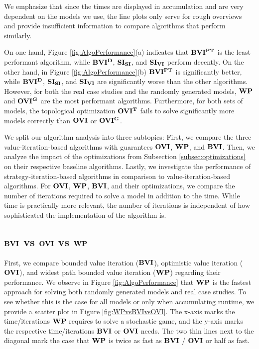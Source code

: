 We emphasize that since the times are displayed in accumulation and are very dependent on the models we use, 
the line plots only serve for rough overviews and provide insufficient information to compare algorithms that perform similarly.

On one hand, Figure \ref{fig:AlgoPerformance}(a) indicates that $\mathbf{BVI^{PT}}$ is the least performant algorithm, while $\mathbf{BVI^D}$, $\mathbf{SI_{SI}}$, and $\mathbf{SI_{VI}}$ perform decently.
On the other hand, in Figure \ref{fig:AlgoPerformance}(b) $\mathbf{BVI^{PT}}$ is significantly better, while $\mathbf{BVI^D}$, $\mathbf{SI_{SI}}$, and $\mathbf{SI_{VI}}$ are significantly worse than the other algorithms.
However, for both the real case studies and the randomly generated models, $\mathbf{WP}$ and $\mathbf{OVI^G}$ are the most performant algorithms. 
Furthermore, for both sets of models, the topological optimization $\mathbf{OVI^T}$ fails to solve significantly more models correctly than $\mathbf{OVI}$ or $\mathbf{OVI^G}$.

We split our algorithm analysis into three subtopics: 
First, we compare the three value-iteration-based algorithms with guarantees $\mathbf{OVI}$, $\mathbf{WP}$, and $\mathbf{BVI}$. 
Then, we analyze the impact of the optimizations from Subsection \ref{subsec:optimizations} on their respective baseline algorithms.
Lastly, we investigate the performance of strategy-iteration-based algorithms in comparison to value-iteration-based algorithms.
For $\mathbf{OVI}$, $\mathbf{WP}$, $\mathbf{BVI}$, and their optimizations, we compare the number of iterations required to solve a model in addition to the time.
While time is practically more relevant, the number of iterations is independent of how sophisticated the implementation of the algorithm is.
\FloatBarrier

\subsection{$\mathbf{BVI}$ vs $\mathbf{OVI}$ vs $\mathbf{WP}$}
First, we compare bounded value iteration ($\mathbf{BVI}$), optimistic value iteration ($\mathbf{OVI}$), and widest path bounded value iteration ($\mathbf{WP}$) regarding their performance.
We observe in Figure \ref{fig:AlgoPerformance} that $\mathbf{WP}$ is the fastest approach for solving both randomly generated models and real case studies.
To see whether this is the case for all models or only when accumulating runtime, we provide a scatter plot in Figure \ref{fig:WPvsBVIvsOVI}.
The x-axis marks the time/iterations $\mathbf{WP}$ requires to solve a stochastic game, and the y-axis marks the respective time/iterations $\mathbf{BVI}$ or $\mathbf{OVI}$ needs.
The two thin lines next to the diagonal mark the case that $\mathbf{WP}$ is twice as fast as $\mathbf{BVI}$ / $\mathbf{OVI}$ or half as fast.

